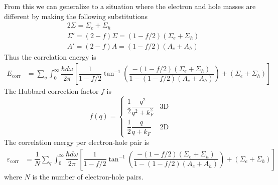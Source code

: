 \documentclass[aps,prb,onecolumn,notitlepage,showpacs,floatfix,superscriptaddress]{revtex4-1}
\begin{document}
From this we can generalize to a situation where the electron and hole masses are different by making the following substitutions
\begin{equation}
\begin{split}
& 2 \Sigma = \Sigma_{e} +\Sigma_{h} \\
& \Sigma' = (2-f) \Sigma = (1-f/2) (\Sigma_{e} +\Sigma_{h}) \\
& A' = (2-f) A = (1-f/2) (A_{e} +A_{h})
\end{split}
\end{equation}
Thus the correlation energy is
\begin{equation}
\begin{split}
E_{\mathrm{corr}}&=\sum_{q} \int_{0}^{\infty} \dfrac{\hbar d\omega}{2\pi} \left[ \dfrac{1}{1-f/2} \tan^{-1} \left(\dfrac{-(1-f/2) (\Sigma_{e} +\Sigma_{h})}{1-(1-f/2) (A_{e} +A_{h})} \right)+ (\Sigma_{e} +\Sigma_{h}) \right] 
\end{split}
\end{equation} 
The Hubbard correction factor $f$ is
\begin{equation*} 
f(q)=\begin{cases}
\dfrac{1}{2}\dfrac{q^2}{q^2+k_{F}^{2}} &\text{3D} \\
\dfrac{1}{2}\dfrac{q}{q+k_{F}} &\text{2D} 
\end{cases} 
\end{equation*}
The correlation energy per electron-hole pair is 
\begin{equation}
\begin{split}
\varepsilon_\mathrm{corr}&=\dfrac{1}{N}\sum_{q} \int_{0}^{\infty} \dfrac{\hbar d\omega}{2\pi} \left[ \dfrac{1}{1-f/2} \tan^{-1} \left(\dfrac{-(1-f/2) (\Sigma_{e} +\Sigma_{h})}{1-(1-f/2) (A_{e} +A_{h})} \right)+ (\Sigma_{e} +\Sigma_{h}) \right] 
\end{split}
\end{equation}
where $N$ is the number of electron-hole pairs.
\end{document}
